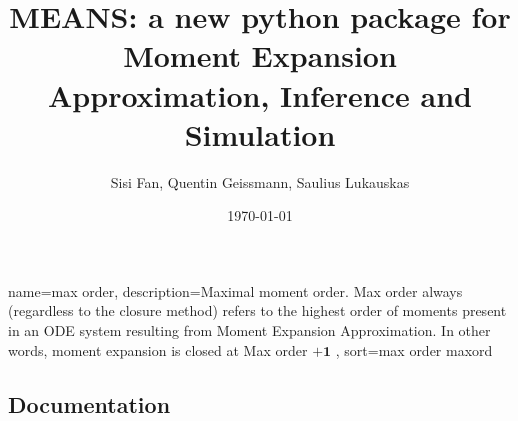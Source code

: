 \documentclass[11pt,a4paper]{article}
\newcommand{\sauliustodo}[2][]{\todo[color=cyan, #1]{\textbf{SL:} #2}}
\begin{document}
\listoftodos
\newpage

\title{MEANS: a new python package for Moment Expansion Approximation, Inference and Simulation}
\author{Sisi Fan, Quentin Geissmann, Saulius Lukauskas}
\date{\today}

\clearpage\maketitle
\thispagestyle{empty}
\newpage{}


\begin{abstract}
\end{abstract}

\tableofcontents

{
  name=max order,
  description={Maximal moment order. Max order always (regardless to the closure method) refers to the highest order of 
  moments present in an ODE system resulting from Moment Expansion Approximation. In other words, moment expansion is closed at Max order $\mathbf{+1}$
   },
  sort=max order
}
\gls{maxord}
\newpage{}
\printglossaries

\newpage{}

\newpage

\newpage{}

\newpage{}

\newpage{}

\newpage{}
{}


\newpage{}
\begin{appendices}
\section{Documentation}
\label{sec:documentation}
\sauliustodo[inline]{add docs here}
\end{appendices}
   
\end{document}
